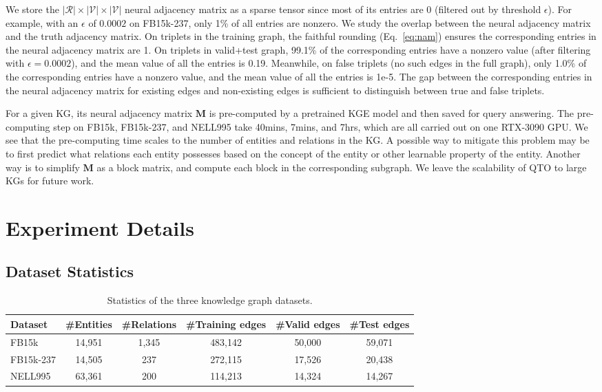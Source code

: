 We store the $|\mathcal{R}|\times|\mathcal{V}|\times|\mathcal{V}|$ neural adjacency matrix as a sparse tensor since most of its entries are 0 (filtered out by threshold $\epsilon$). For example, with an $\epsilon$ of $0.0002$ on FB15k-237, only 1\% of all entries are nonzero. We study the overlap between the neural adjacency matrix and the truth adjacency matrix. On triplets in the training graph, the faithful rounding (Eq.~\ref{eq:nam}) ensures the corresponding entries in the neural adjacency matrix are 1. On triplets in valid+test graph, 99.1\% of the corresponding entries have a nonzero value (after filtering with $\epsilon=0.0002$), and the mean value of all the entries is 0.19. Meanwhile, on false triplets (no such edges in the full graph), only 1.0\% of the corresponding entries have a nonzero value, and the mean value of all the entries is 1e-5. The gap between the corresponding entries in the neural adjacency matrix for existing edges and non-existing edges is sufficient to distinguish between true and false triplets.

For a given KG, its neural adjacency matrix $\mathbf{M}$ is pre-computed by a pretrained KGE model and then saved for query answering.
The pre-computing step on FB15k, FB15k-237, and NELL995 take 40mins, 7mins, and 7hrs, which are all carried out on one RTX-3090 GPU.
We see that the pre-computing time scales to the number of entities and relations in the KG.
A possible way to mitigate this problem may be to first predict what relations each entity possesses based on the concept of the entity or other learnable property of the entity.
Another way is to simplify $\mathbf{M}$ as a block matrix, and compute each block in the corresponding subgraph.
We leave the scalability of QTO to large KGs for future work.

\section{Experiment Details}

\subsection{Dataset Statistics}
\label{app:stat}

\begin{table*}[!h]
\centering
\begin{tabular}{lccccc}
\toprule
\bf{Dataset} & \bf{\#Entities} & \bf{\#Relations} & \bf{\#Training edges} & \bf{\#Valid edges} & \bf{\#Test edges} \\
\midrule
FB15k & 14,951 & 1,345 & 483,142 & 50,000 & 59,071 \\
FB15k-237 & 14,505 & 237 & 272,115 & 17,526 & 20,438 \\
NELL995 & 63,361 & 200 & 114,213 & 14,324 & 14,267 \\
\toprule
\end{tabular}
\caption{Statistics of the three knowledge graph datasets.}
\label{tb:stat}
\end{table*}

